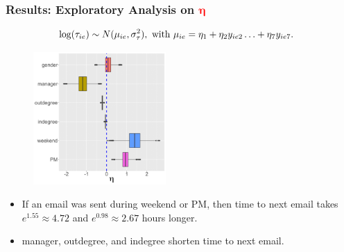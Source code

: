 \documentclass{beamer}
\begin{document}
				\begin{frame}
					\frametitle{Results: Exploratory Analysis on \textcolor{red}{$\boldsymbol{\eta}$}}
					\begin{equation*}
					\begin{aligned}
					&\log(\tau_{ie}) \sim N(\mu_{ie}, \sigma_\tau^2), \mbox{ with }
\mu_{ie} = \eta_{1}+\eta_{2} y_{ie2}\ldots+\eta_{7}y_{ie7}.
					\end{aligned}
					\normalsize
					\end{equation*}
			\begin{figure}[H]
				\centering
				\includegraphics[width=0.45\textwidth]{etaplotnew-1.png}	
			\end{figure}	
								\begin{itemize}
						\item If an email was sent during weekend or PM, then time
						to next email takes $e^{1.55} \approx 4.72$ and $e^{0.98}\approx 2.67$
hours longer.\vspace{0.15cm}
						\item manager, outdegree, and indegree shorten time to next email.						
					\end{itemize}				
				\end{frame}				
				
\end{document}
